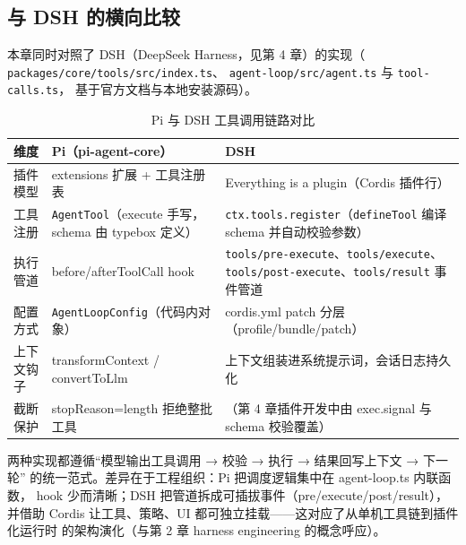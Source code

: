 \subsection{与 DSH 的横向比较}

本章同时对照了 DSH（DeepSeek Harness，见第 4 章）的实现（
\nolinkurl{packages/core/tools/src/index.ts}、
\nolinkurl{agent-loop/src/agent.ts} 与 \nolinkurl{tool-calls.ts}，
基于官方文档与本地安装源码）。

\begin{table}[H]
\centering
\caption{Pi 与 DSH 工具调用链路对比}
\label{tab:pi_dsh}
\small
\setlength{\tabcolsep}{4pt}
\begin{tabular}{p{2.6cm}p{5.7cm}p{5.7cm}}
\toprule
\textbf{维度} & \textbf{Pi（pi-agent-core）} & \textbf{DSH} \\
\midrule
插件模型 & extensions 扩展 + 工具注册表 & Everything is a plugin（Cordis 插件行） \\
工具注册 & \texttt{AgentTool}（execute 手写，schema 由 typebox 定义） & \texttt{ctx.tools.register}（\texttt{defineTool} 编译
schema 并自动校验参数） \\
执行管道 & before/afterToolCall hook & \texttt{tools/pre-execute}、\texttt{tools/execute}、\texttt{tools/post-execute}、\texttt{tools/result} 事件管道 \\
配置方式 & \texttt{AgentLoopConfig}（代码内对象） & cordis.yml patch 分层（profile/bundle/patch） \\
上下文钩子 & transformContext / convertToLlm & 上下文组装进系统提示词，会话日志持久化 \\
截断保护 & stopReason=length 拒绝整批工具 & （第 4 章插件开发中由 exec.signal 与 schema 校验覆盖） \\
\bottomrule
\end{tabular}
\end{table}

两种实现都遵循``模型输出工具调用 → 校验 → 执行 → 结果回写上下文 → 下一轮''
的统一范式。差异在于工程组织：Pi 把调度逻辑集中在 agent-loop.ts 内联函数，
hook 少而清晰；DSH 把管道拆成可插拔事件（pre/execute/post/result），并借助
Cordis 让工具、策略、UI 都可独立挂载——这对应了从单机工具链到插件化运行时
的架构演化（与第 2 章 harness engineering 的概念呼应）。

